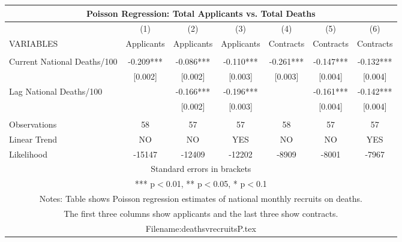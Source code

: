 \documentclass[]{article}
\begin{document}
\begin{tabular}{lcccccc}
\multicolumn{7}{c}{Poisson Regression: Total Applicants vs. Total Deaths} \\ \hline
 & (1) & (2) & (3) & (4) & (5) & (6) \\
VARIABLES & Applicants & Applicants & Applicants & Contracts & Contracts & Contracts \\ \hline
 &  &  &  &  &  &  \\
Current National Deaths/100 & -0.209*** & -0.086*** & -0.110*** & -0.261*** & -0.147*** & -0.132*** \\
 & [0.002] & [0.002] & [0.003] & [0.003] & [0.004] & [0.004] \\
Lag National Deaths/100 &  & -0.166*** & -0.196*** &  & -0.161*** & -0.142*** \\
 &  & [0.002] & [0.003] &  & [0.004] & [0.004] \\
 &  &  &  &  &  &  \\
Observations & 58 & 57 & 57 & 58 & 57 & 57 \\
Linear Trend & NO & NO & YES & NO & NO & YES \\
 Likelihood & -15147 & -12409 & -12202 & -8909 & -8001 & -7967 \\ \hline
\multicolumn{7}{c}{ Standard errors in brackets} \\
\multicolumn{7}{c}{ *** p$<$0.01, ** p$<$0.05, * p$<$0.1} \\
\multicolumn{7}{c}{ Notes: Table shows Poisson regression estimates of national monthly recruits on deaths.} \\
\multicolumn{7}{c}{ The first three columns show applicants and the last three show contracts.} \\
\multicolumn{7}{c}{ Filename:deathsvrecruitsP.tex} \\
\end{tabular}
\end{document}
